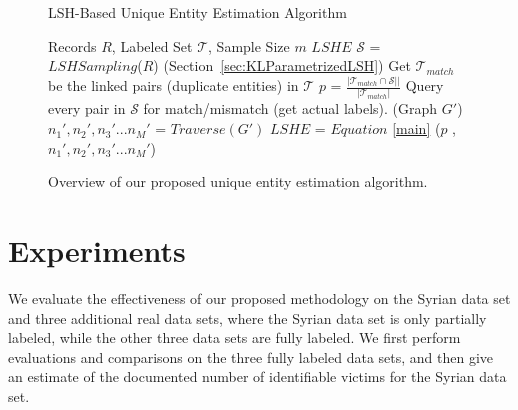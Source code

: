 \documentclass{imsart}
\begin{document}
\begin{figure}
	\begin{minipage}{\textwidth}
		\begin{algorithm}[H]
			\caption{LSH-Based Unique Entity Estimation Algorithm}
			\label{Est}
			\begin{algorithmic}[1]
				 Records $R$, Labeled Set $\mathcal{T}$, Sample Size $m$
				 $LSHE$
				\STATE $\mathcal{S}$ = $LSH Sampling$($R$) (Section~\ref{sec:KLParametrizedLSH})
                \STATE Get $\mathcal{T}_{match}$ be the linked pairs (duplicate entities) in $\mathcal{T}$
				\STATE $p$ = $\frac{|\mathcal{T}_{match} \cap \mathcal{S}||}{|\mathcal{T}_{match}|}$
                \STATE Query every pair in $\mathcal{S}$ for match/mismatch (get actual labels). (Graph $G'$)
				\STATE $n_1', n_2', n_3'... n_M'$ = $Traverse(G')$
				\STATE $LSHE$ = $Equation$ \ref{main} ($p$ , $n_1', n_2', n_3'... n_M'$)
			\end{algorithmic}
		\end{algorithm}
	\end{minipage}
	\caption{Overview of our proposed unique entity estimation algorithm.}
\label{samplep}
	\end{figure}

\section{Experiments}
\label{experiments}

We evaluate the effectiveness of our proposed methodology on the Syrian data set and three additional real data sets, where the Syrian data set is only partially labeled, while the other three data sets are fully labeled. We first perform evaluations and comparisons on the three fully labeled data sets, and then give an estimate of the documented number of identifiable victims for the Syrian data set.
\end{document}
